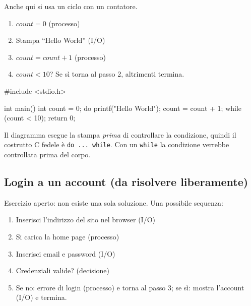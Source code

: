 \documentclass[11pt,a4paper]{article}
\begin{document}
Anche qui si usa un ciclo con un contatore.

\begin{enumerate}
    \item $count = 0$ (processo)
    \item Stampa ``Hello World'' (I/O)
    \item $count = count + 1$ (processo)
    \item $count < 10$? Se sì torna al passo 2, altrimenti termina.
\end{enumerate}

\begin{center}
\end{center}

\begin{codice}
#include <stdio.h>

int main() {
    int count = 0;
    do {
        printf("Hello World\n");
        count = count + 1;
    } while (count < 10);
    return 0;
}
\end{codice}

\begin{osservazione}
Il diagramma esegue la stampa \emph{prima} di controllare la condizione, quindi
il costrutto C fedele è \lstinline|do ... while|. Con un \lstinline|while|
la condizione verrebbe controllata prima del corpo.
\end{osservazione}

\subsection{Login a un account (da risolvere liberamente)}

Esercizio aperto: non esiste una sola soluzione. Una possibile sequenza:
\begin{enumerate}
    \item Inserisci l'indirizzo del sito nel browser (I/O)
    \item Si carica la home page (processo)
    \item Inserisci email e password (I/O)
    \item Credenziali valide? (decisione)
    \item Se no: errore di login (processo) e torna al passo 3;
          se sì: mostra l'account (I/O) e termina.
\end{enumerate}
\end{document}
